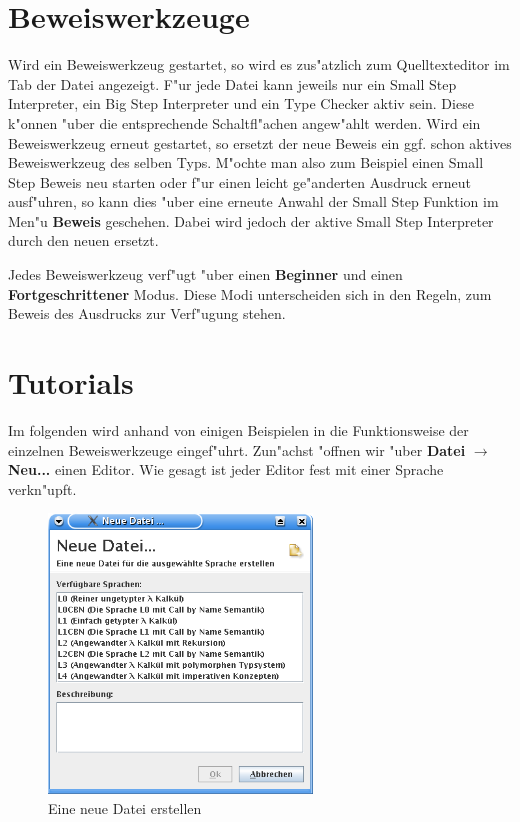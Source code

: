 \section {Beweiswerkzeuge}
\label{Beweiswerkzeuge} Wird ein Beweiswerkzeug gestartet, so wird
es zus"atzlich zum Quelltexteditor im Tab der Datei angezeigt. F"ur
jede Datei kann jeweils nur ein Small Step Interpreter, ein Big Step
Interpreter und ein Type Checker aktiv sein. Diese k"onnen "uber die
entsprechende Schaltfl"achen angew"ahlt werden. Wird ein
Beweiswerkzeug erneut gestartet, so ersetzt der neue Beweis ein ggf.
schon aktives Beweiswerkzeug des selben Typs. M"ochte man also zum
Beispiel einen Small Step Beweis neu starten oder f"ur einen leicht
ge"anderten Ausdruck erneut ausf"uhren, so kann dies "uber eine
erneute Anwahl der Small Step Funktion im Men"u {\bf Beweis}
geschehen. Dabei wird jedoch der aktive Small Step Interpreter durch
den neuen ersetzt.

Jedes Beweiswerkzeug verf"ugt "uber einen {\bf Beginner} und einen
{\bf Fortgeschrittener} Modus. Diese Modi unterscheiden sich in den
Regeln, zum Beweis des Ausdrucks zur Verf"ugung stehen.

\section {Tutorials}
Im folgenden wird anhand von einigen Beispielen in die
Funktionsweise der einzelnen Beweiswerkzeuge eingef"uhrt. Zun"achst
"offnen wir "uber {\bf Datei} $\rightarrow$ {\bf Neu...} einen
Editor. Wie gesagt ist jeder Editor fest mit einer Sprache
verkn"upft.

\begin{figure}[h]
\begin{center}
\includegraphics[width=7cm]{images/new-dialog.png}
\caption{Eine neue Datei erstellen}
\end{center}
\end{figure}

